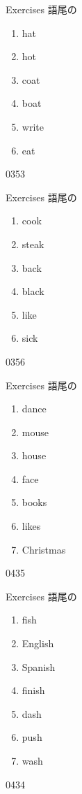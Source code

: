 \documentclass[aspectratio=169,xcolor={dvipsnames,table}]{beamer}
\begin{document}
\begin{frame}[plain]{Exercises 語尾の}
  \Large
  \begin{enumerate}
    \item hat
    \item hot
    \item coat
    \item boat
    \item write
    \item eat
  \end{enumerate}

  \hfill{\tiny 0353}\,{\scriptsize {}}\end{frame}
\begin{frame}[plain]{Exercises 語尾の}
  \Large
  \begin{enumerate}
    \item cook
    \item steak
    \item back
    \item black
    \item like
    \item sick
  \end{enumerate}

  \hfill{\tiny 0356}\,{\scriptsize {}}\end{frame}
\begin{frame}[plain]{Exercises 語尾の}
  \Large
  \begin{enumerate}
    \item dance
    \item mouse
    \item house
    \item face
    \item books
    \item likes
    \item Christmas
  \end{enumerate}

  \hfill{\tiny 0435}\,{\scriptsize {}}\end{frame}
\begin{frame}[plain]{Exercises 語尾の}
  \Large
  \begin{enumerate}
    \item fish
    \item English
    \item Spanish
    \item finish
    \item dash
    \item push
    \item wash
  \end{enumerate}

  \vspace{-10pt}

  \hfill{\tiny 0434}\,{\scriptsize {}}\end{frame}
\end{document}
